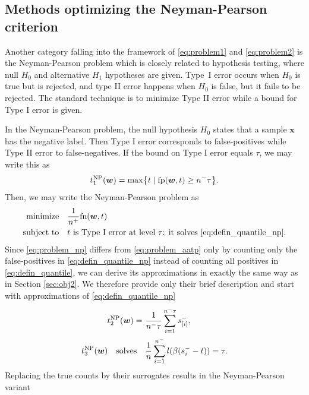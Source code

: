\subsection{Methods optimizing the Neyman-Pearson criterion}\label{sec:obj3}

Another category falling into the framework of \eqref{eq:problem1} and \eqref{eq:problem2} is the Neyman-Pearson problem which is closely related to hypothesis testing, where null $H_0$ and alternative $H_1$ hypotheses are given. Type~I error occurs when $H_0$ is true but is rejected, and type II error happens when $H_0$ is false, but it fails to be rejected. The standard technique is to minimize Type II error while a bound for Type I error is given.

In the Neyman-Pearson problem, the null hypothesis $H_0$ states that a sample $\bm{x}$ has the negative label. Then Type I error corresponds to false-positives while Type II error to false-negatives. If the bound on Type I error equals $\tau$, we may write this as
\begin{equation}\label{eq:defin_quantile_np} 
  t_1^{\rm NP}(\bm{w}) = \max\Brac[c]{t \mid \fp(\bm{w},t) \ge n^- \tau}.
\end{equation}
Then, we may write the Neyman-Pearson problem as
\begin{equation}\label{eq:problem_np}
  \begin{aligned}
    \operatorname*{minimize}
    & \quad \frac{1}{n^{+}}\textnormal{fn}(\bm{w},t) \\
    \operatorname{subject\ to}
    & \quad t \text{ is Type I error at level \ensuremath{\tau}: it solves }\eqref{eq:defin_quantile_np}.
  \end{aligned}
\end{equation}
Since \eqref{eq:problem_np} differs from \eqref{eq:problem_aatp} only by counting only the false-positives in \eqref{eq:defin_quantile_np} instead of counting all positives in \eqref{eq:defin_quantile}, we can derive its approximations in exactly the same way as in Section \ref{sec:obj2}. We therefore provide only their brief description and start with approximations of \eqref{eq:defin_quantile_np}
\begin{align}
  \label{eq:defin_quantile1_np} t_2^{\rm NP}(\bm{w}) =\ &\frac{1}{n^-\tau}\sum_{i=1}^{n^-\tau} s_{[i]}^-, \\
  \label{eq:defin_quantile0_np} t_3^{\rm NP}(\bm{w})\quad \text{solves} \quad &\frac{1}{n}\sum_{i=1}^{n^-}l(\beta(s_i^- - t)) = \tau.
\end{align}
Replacing the true counts by their surrogates results in the Neyman-Pearson variant \GrillNP
